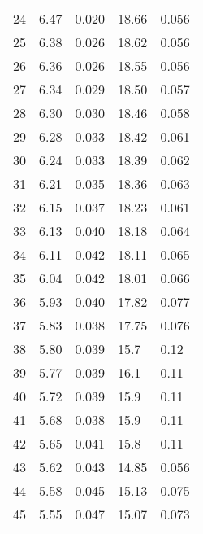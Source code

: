 \begin{table}
\begin{tabular}{c|ll|ll}
24 & 6.47 & 0.020 & 18.66 & 0.056 \\
25 & 6.38 & 0.026 & 18.62 & 0.056 \\
26 & 6.36 & 0.026 & 18.55 & 0.056 \\
27 & 6.34 & 0.029 & 18.50 & 0.057 \\
28 & 6.30 & 0.030 & 18.46 & 0.058 \\
29 & 6.28 & 0.033 & 18.42 & 0.061 \\
30 & 6.24 & 0.033 & 18.39 & 0.062 \\
31 & 6.21 & 0.035 & 18.36 & 0.063 \\
32 & 6.15 & 0.037 & 18.23 & 0.061 \\
33 & 6.13 & 0.040 & 18.18 & 0.064 \\
34 & 6.11 & 0.042 & 18.11 & 0.065 \\
35 & 6.04 & 0.042 & 18.01 & 0.066 \\
36 & 5.93 & 0.040 & 17.82 & 0.077 \\
37 & 5.83 & 0.038 & 17.75 & 0.076 \\
38 & 5.80 & 0.039 & 15.7 & 0.12 \\
39 & 5.77 & 0.039 & 16.1 & 0.11 \\
40 & 5.72 & 0.039 & 15.9 & 0.11 \\
41 & 5.68 & 0.038 & 15.9 & 0.11 \\
42 & 5.65 & 0.041 & 15.8 & 0.11 \\
43 & 5.62 & 0.043 & 14.85 & 0.056 \\
44 & 5.58 & 0.045 & 15.13 & 0.075 \\
45 & 5.55 & 0.047 & 15.07 & 0.073 \\
               \hline
        \end{tabular}
    \end{table}
    \clearpage

